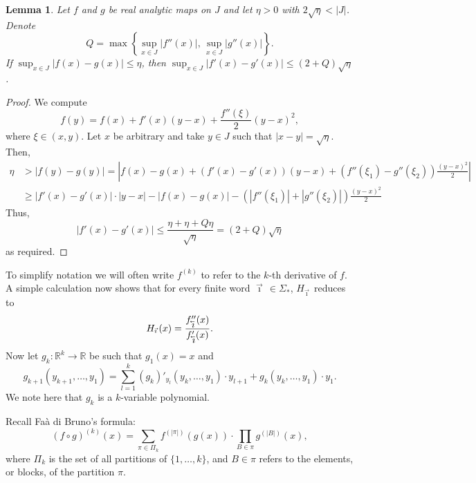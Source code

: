 \documentclass[12pt,]{article}
\newtheorem{lemma}[theorem]{Lemma}
\theoremstyle{definition}
\theoremstyle{remark}
\renewcommand{\Bbb}[1]{\mathbb{#1}}
\newcommand{\bbR}{{\Bbb R}}        %
\newcommand{\0}{\mathbf{0}}
\newcommand{\cev}[1]{\reflectbox{\ensuremath{\vec{\reflectbox{\ensuremath{#1}}}}}}
\newcommand{\bi}{\vec{\imath}\,}
\newcommand{\bbi}{\,\cev{\imath}}
\begin{document}
\begin{lemma}\label{thm:analyticity}
  Let $f$ and $g$ be real analytic maps on $J$
  and let $\eta>0$ with $2\sqrt{\eta}<|J|$.
  Denote
  \[
    Q = \max\left\{\sup_{x\in J} |f''(x)|,\, \sup_{x\in J}|g''(x)|\right\}.
  \]
  If $\sup_{x\in J} |f(x)-g(x)| \leq \eta$, then $\sup_{x\in J} |f'(x)-g'(x)|\leq (2+Q)\sqrt{\eta}$.
\end{lemma}
\begin{proof}
  We compute
  \[
    f(y) = f(x) + f'(x)(y-x)+ \frac{f''(\xi)}{2}(y-x)^2,
  \]
  where $\xi\in(x,y)$.
  Let $x$ be arbitrary and take $y\in J$ such that $|x-y|=\sqrt{\eta}$.
  Then,
  \begin{align*}
    \eta &> |f(y)-g(y)| =
    \left|f(x)-g(x)+(f'(x)-g'(x))(y-x)+(f''(\xi_1)-g''(\xi_2))\frac{(y-x)^2}{2}\right|\\
	 &\geq |f'(x)-g'(x)|\cdot|y-x|-|f(x)-g(x)|-(|f''(\xi_1)|+|g''(\xi_2)|)\frac{(y-x)^2}{2}
  \end{align*}
  Thus,
  \[
    |f'(x)-g'(x)| \leq \frac{\eta+\eta+Q \eta}{\sqrt{\eta}} = (2+Q)\sqrt{\eta}
  \]
  as required.
\end{proof}

To simplify notation we will often write $f^{(k)}$ to refer to the $k$-th derivative of $f$.
A simple calculation now shows that for every finite word $\bi\in\Sigma_*$, $H_{\bi}$ reduces to
\[
  H_{\bi}(x) = \frac{f''_{\bbi}(x)}{f'_{\bbi}(x)}.
\]
Now let $g_k:\bbR^k\to \bbR$ be such that $g_1(x)=x$ and 
\[
  g_{k+1}(y_{k+1},\dots,y_1)=\sum_{l=1}^k (g_k)'_{y_l}(y_k,\dots,y_1)\cdot y_{l+1} +
  g_k(y_k,\dots,y_1)\cdot y_1.
\]
We note here that $g_k$ is a $k$-variable polynomial.

Recall Fa\`a di Bruno's formula:
\[
  (f\circ g)^{(k)}(x) = \sum_{\pi\in \Pi_k} f^{(|\pi|)}(g(x)) \cdot \prod_{B\in\pi}
  g^{(|B|)}(x),
\]
where $\Pi_k$ is the set of all partitions of $\{1,\dots,k\}$, and $B\in \pi$ refers to the
elements, or blocks, of the partition $\pi$.
\end{document}

